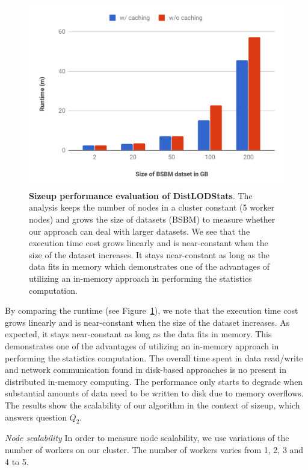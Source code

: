 \begin{figure}
 \includegraphics[width=1.0\columnwidth]{images/4_distlodstats/distlodstats-sizeup-performance.pdf}
\caption{\textbf{Sizeup performance evaluation of DistLODStats}.
The analysis keeps the number of nodes in a cluster constant (5 worker nodes) and grows the size of datasets (BSBM) to measure whether our approach can deal with larger datasets.
We see that the execution time cost grows linearly and is near-constant when the size of the dataset increases.
It stays near-constant as long as the data fits in memory which demonstrates one of the advantages of utilizing an in-memory approach in performing the statistics computation.
}
\label{fig:Sizeup}
\end{figure}

By comparing the runtime (see Figure~\ref{fig:Sizeup}), we note that the execution time cost grows linearly and is near-constant when the size of the dataset increases.
As expected, it stays near-constant as long as the data fits in memory.
This demonstrates one of the advantages of utilizing an in-memory approach in performing the statistics computation.
The overall time spent in data read/write and network communication found in disk-based approaches is no present in distributed in-memory computing. 
The performance only starts to degrade when substantial amounts of data need to be written to disk due to memory overflows. 
The results show the scalability of our algorithm in the context of sizeup, which answers question $Q_2$.

\noindent
\textit{Node scalability} In order to measure node scalability, we use variations of the number of workers on our cluster.
The number of workers varies from 1, 2, 3 and 4 to 5.

